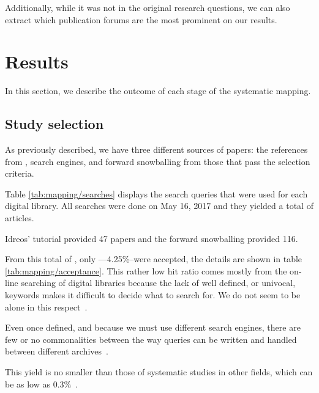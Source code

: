Additionally, while it was not in the original research questions, we can
also extract which publication forums are the most prominent on our results.

\section{Results}
\label{sec:mapping/results}
In this section, we describe the outcome of each stage of the systematic mapping.

\subsection{Study selection}
As previously described, we have three different sources of papers:
the references from \cite{Idreos2015}, search engines, and forward snowballing
from those that pass the selection criteria.

Table \ref{tab:mapping/searches} displays the search queries that were used for
each digital library.
All searches were done on May 16, 2017 and they yielded a total of  articles.

Idreos' tutorial provided 47 papers and the forward snowballing provided 116.

From this total of , only ---4.25\%--were accepted, the details are
shown in table \ref{tab:mapping/acceptance}. This rather low hit ratio
comes mostly from the on-line searching of digital libraries
because the lack of well defined, or univocal, keywords makes it difficult to decide what
to search for. We do not seem to be alone in this respect~\cite{Kitchenham2013,Jorgensen2007}.

Even once defined, and because we must use different search engines, there are
few or no commonalities between the way queries can be written and handled
between different archives~\cite{Bailey2007, Brereton2007}.

This yield is no smaller than those of systematic studies in
other fields, which can be as low as 0.3\%~\cite{Oakley2003}.


